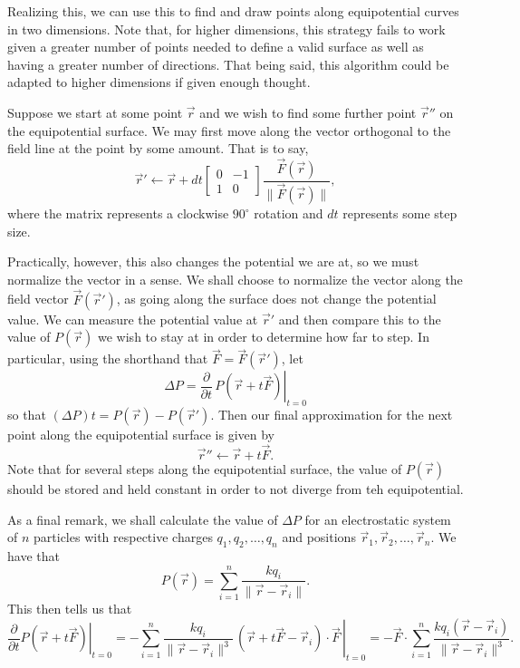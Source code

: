 \documentclass[a4paper, 12pt]{article}
\begin{document}
Realizing this, we can use this to find and draw points along equipotential curves in two dimensions. Note that, for higher dimensions, this strategy fails to work given a greater number of points needed to define a valid surface as well as having a greater number of directions. That being said, this algorithm could be adapted to higher dimensions if given enough thought.

Suppose we start at some point \( \vec{r} \) and we wish to find some further point \( \vec{r}'' \) on the equipotential surface. We may first move along the vector orthogonal to the field line at the point by some amount. That is to say,
\[
    \vec{r}' \leftarrow \vec{r} + dt \begin{bmatrix} 0 & -1 \\ 1 & 0 \end{bmatrix} \frac{\vec{F}(\vec{r})}{\| \vec{F} (\vec{r}) \|}
,\]
where the matrix represents a clockwise \( 90^\circ \) rotation and \( dt \) represents some step size.

Practically, however, this also changes the potential we are at, so we must normalize the vector in a sense. We shall choose to normalize the vector along the field vector \( \vec{F} (\vec{r}') \), as going along the surface does not change the potential value. We can measure the potential value at \( \vec{r}' \) and then compare this to the value of \( P(\vec{r}) \) we wish to stay at in order to determine how far to step. In particular, using the shorthand that \( \vec{F} = \vec{F} (\vec{r}') \), let
\[
    \Delta P = \left. \frac{\partial}{\partial t} \, P(\vec{r} + t \vec{F}) \right\vert_{t = 0}
\]
so that \( (\Delta P) t = P(\vec{r}) - P(\vec{r}') \). Then our final approximation for the next point along the equipotential surface is given by
\[
    \vec{r}'' \leftarrow \vec{r} + t \vec{F}
.\]
Note that for several steps along the equipotential surface, the value of \( P(\vec{r}) \) should be stored and held constant in order to not diverge from teh equipotential.

As a final remark, we shall calculate the value of \( \Delta P \) for an electrostatic system of \( n \) particles with respective charges \( q_1, q_2, \ldots, q_n \) and positions \( \vec{r}_1, \vec{r}_2, \ldots, \vec{r}_n \). We have that
\[
    P(\vec{r}) = \sum_{i = 1}^{n} \frac{kq_i}{\| \vec{r} - \vec{r}_i \|}
.\]
This then tells us that
\[
    \left. \frac{\partial}{\partial t} P(\vec{r} + t \vec{F}) \right\vert_{t = 0} = -\left. \sum_{i = 1}^{n} \frac{k q_i}{\| \vec{r} - \vec{r}_i \|^3} \, (\vec{r} + t \vec{F} - \vec{r}_i) \cdot \vec{F} \, \right\vert_{t = 0} = - \vec{F} \cdot \sum_{i = 1}^{n} \frac{k q_i (\vec{r} - \vec{r}_i)}{\| \vec{r} - \vec{r}_i \|^3}
.\]
\end{document}
